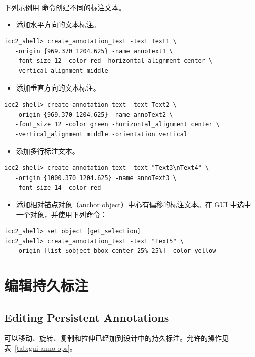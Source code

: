 下列示例用  命令创建不同的标注文本。
\begin{itemize}
  \item 添加水平方向的文本标注。
\end{itemize}
\begin{lstlisting}
icc2_shell> create_annotation_text -text Text1 \
   -origin {969.370 1204.625} -name annoText1 \
   -font_size 12 -color red -horizontal_alignment center \
   -vertical_alignment middle
\end{lstlisting}
\begin{itemize}
  \item 添加垂直方向的文本标注。
\end{itemize}
\begin{lstlisting}
icc2_shell> create_annotation_text -text Text2 \
   -origin {969.370 1204.625} -name annoText2 \
   -font_size 12 -color green -horizontal_alignment center \
   -vertical_alignment middle -orientation vertical
\end{lstlisting}
\begin{itemize}
  \item 添加多行标注文本。
\end{itemize}
\begin{lstlisting}
icc2_shell> create_annotation_text -text "Text3\nText4" \
   -origin {1000.370 1204.625} -name annoText3 \
   -font_size 14 -color red
\end{lstlisting}
\begin{itemize}
  \item 添加相对锚点对象（anchor object）中心有偏移的标注文本。在 GUI 中选中一个对象，并使用下列命令：
\end{itemize}
\begin{lstlisting}
icc2_shell> set object [get_selection]
icc2_shell> create_annotation_text -text "Text5" \
   -origin [list $object bbox_center 25% 25%] -color yellow
\end{lstlisting}

\section{编辑持久标注}
\subsection*{Editing Persistent Annotations}

可以移动、旋转、复制和拉伸已经加到设计中的持久标注。允许的操作见表~\ref{tab:gui-anno-ops}。

